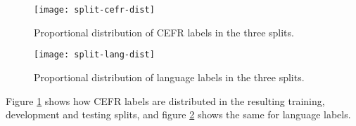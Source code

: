 \begin{figure}
  \centering
  \texttt{[image: split-cefr-dist]}
  \caption{Proportional distribution of CEFR labels in the three splits.}
  \label{fig:split-cefr-dist}
\end{figure}

\begin{figure}
  \centering
  \texttt{[image: split-lang-dist]}
  \caption{Proportional distribution of language labels in the three splits.}
  \label{fig:split-lang-dist}
\end{figure}

Figure \ref{fig:split-cefr-dist} shows how CEFR labels are distributed in the
resulting training, development and testing splits, and figure
\ref{fig:split-lang-dist} shows the same for language labels.

